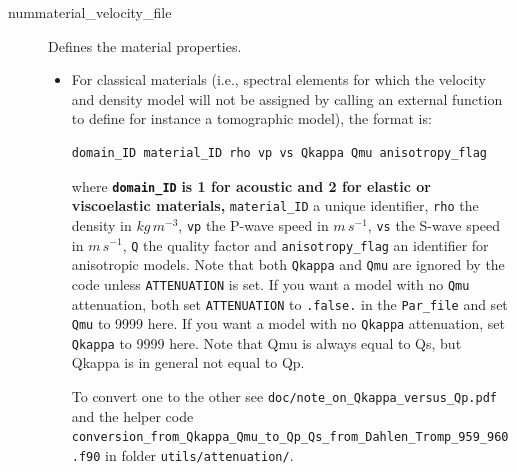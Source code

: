 \begin{description}
\item [{nummaterial\_velocity\_file}] Defines the material properties.

\begin{itemize}
\item For classical materials (i.e., spectral elements for which the velocity
and density model will not be assigned by calling an external function
to define for instance a tomographic model), the format is:

\begin{verbatim}
domain_ID material_ID rho vp vs Qkappa Qmu anisotropy_flag
\end{verbatim}

where \texttt{\textbf{domain\_ID}}\textbf{ is 1 for acoustic and 2
for elastic or viscoelastic materials,} \texttt{material\_ID} a unique
identifier, \texttt{rho} the density in $kg\, m^{-3}$, \texttt{vp}
the P-wave speed in $m\, s^{-1}$, \texttt{vs} the S-wave speed in
$m\, s^{-1}$, \texttt{Q} the quality factor and \texttt{anisotropy\_flag}
an identifier for anisotropic models.
Note that both \texttt{Qkappa} and \texttt{Qmu} are ignored
by the code unless \texttt{ATTENUATION} is set. If you want a model
with no \texttt{Qmu} attenuation, both set \texttt{ATTENUATION} to
\texttt{.false.} in the \texttt{Par\_file} and set \texttt{Qmu} to
9999 here. If you want a model with no \texttt{Qkappa} attenuation, set \texttt{Qkappa} to 9999 here.
Note that Qmu is always equal to Qs, but Qkappa is in general not equal to Qp.

To convert one to the other see \texttt{doc/note\_on\_Qkappa\_versus\_Qp.pdf} and the helper code\\
\texttt{conversion\_from\_Qkappa\_Qmu\_to\_Qp\_Qs\_from\_Dahlen\_Tromp\_959\_960.f90} in folder
\texttt{utils/attenuation/}.


\end{itemize}
\end{description}
